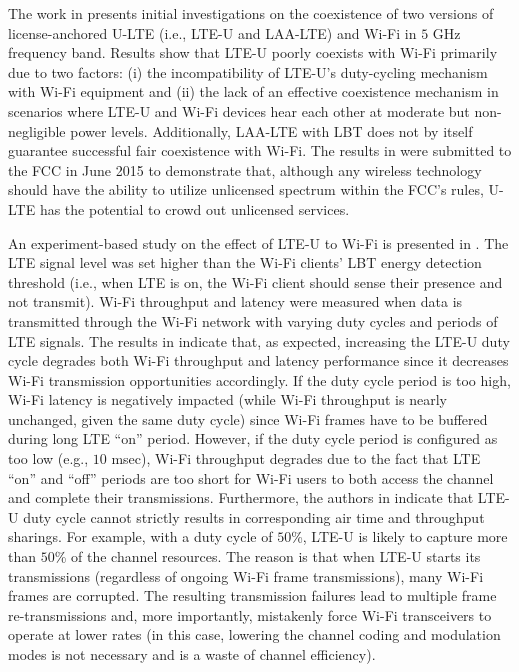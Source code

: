 The work in \cite{U-LTE-Google-WP} presents initial investigations on the coexistence of two versions of license-anchored \mbox{U-LTE} (i.e., \mbox{LTE-U} and \mbox{LAA-LTE}) and \mbox{Wi-Fi} in $5$ GHz frequency band. Results show that \mbox{LTE-U} poorly coexists with \mbox{Wi-Fi} primarily due to two factors: (i) the incompatibility of \mbox{LTE-U}'s duty-cycling mechanism with \mbox{Wi-Fi} equipment and (ii) the lack of an effective coexistence mechanism in scenarios where \mbox{LTE-U} and \mbox{Wi-Fi} devices hear each other at moderate but non-negligible power levels. Additionally, \mbox{LAA-LTE} with LBT does not by itself guarantee successful fair coexistence with \mbox{Wi-Fi}. The results in \cite{U-LTE-Google-WP} were submitted to the FCC in June 2015 to demonstrate that, although any wireless technology should have the ability to utilize unlicensed spectrum within the FCC's rules, \mbox{U-LTE} has the potential to crowd out unlicensed services.

An experiment-based study on the effect of \mbox{LTE-U} to \mbox{Wi-Fi} is presented in \cite{LTE-U-CableLabs}. The LTE signal level was set higher than the \mbox{Wi-Fi} clients' LBT energy detection threshold (i.e., when LTE is on, the \mbox{Wi-Fi} client should sense their presence and not transmit). \mbox{Wi-Fi} throughput and latency were measured when data is transmitted through the \mbox{Wi-Fi} network with varying duty cycles and periods of LTE signals. The results in \cite{LTE-U-CableLabs} indicate that, as expected, increasing the \mbox{LTE-U} duty cycle degrades both \mbox{Wi-Fi} throughput and latency performance since it decreases \mbox{Wi-Fi} transmission opportunities accordingly. If the duty cycle period is too high, \mbox{Wi-Fi} latency is negatively impacted (while \mbox{Wi-Fi} throughput is nearly unchanged, given the same duty cycle) since \mbox{Wi-Fi} frames have to be buffered during long LTE ``on'' period. However, if the duty cycle period is configured as too low (e.g., $10$ msec), \mbox{Wi-Fi} throughput degrades due to the fact that LTE ``on'' and ``off'' periods are too short for \mbox{Wi-Fi} users to both access the channel and complete their transmissions. Furthermore, the authors in \cite{LTE-U-CableLabs} indicate that \mbox{LTE-U} duty cycle cannot strictly results in corresponding air time and throughput sharings. For example, with a duty cycle of $50$\%, \mbox{LTE-U} is likely to capture more than $50$\% of the channel resources. The reason is that when \mbox{LTE-U} starts its transmissions (regardless of ongoing \mbox{Wi-Fi} frame transmissions), many \mbox{Wi-Fi} frames are corrupted. The resulting transmission failures lead to multiple frame re-transmissions and, more importantly, mistakenly force \mbox{Wi-Fi} transceivers to operate at lower rates (in this case, lowering the channel coding and modulation modes is not necessary and is a waste of channel efficiency).


